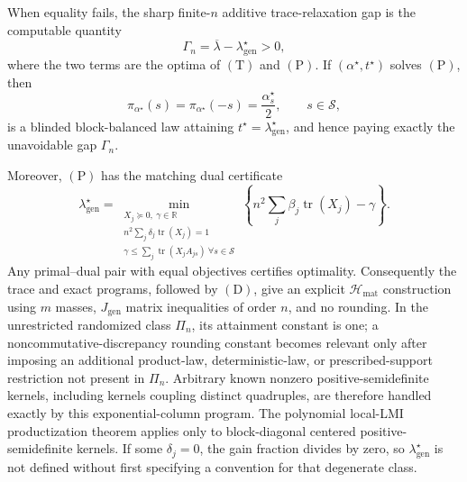When equality fails, the sharp finite-\(n\) additive trace-relaxation gap is the computable quantity
\[
\Gamma_n=\overline\lambda-\lambda_{\mathrm{gen}}^\star>0,
\tag{G}
\]
where the two terms are the optima of \((\mathrm T)\) and \((\mathrm P)\). If \((\alpha^\star,t^\star)\) solves \((\mathrm P)\), then
\[
\pi_{\alpha^\star}(s)=\pi_{\alpha^\star}(-s)=\frac{\alpha_s^\star}{2},
\qquad s\in\mathscr S,
\tag{D}
\]
is a blinded block-balanced law attaining \(t^\star=\lambda_{\mathrm{gen}}^\star\), and hence paying exactly the unavoidable gap \(\Gamma_n\).

Moreover, \((\mathrm P)\) has the matching dual certificate
\[
\lambda_{\mathrm{gen}}^\star
=\min_{\substack{X_j\succeq0,\ \gamma\in\mathbb R\\
n^2\sum_j\delta_j\operatorname{tr}(X_j)=1\\
\gamma\le\sum_j\operatorname{tr}(X_jA_{js})\ \forall s\in\mathscr S}}
\left\{
n^2\sum_j\beta_j\operatorname{tr}(X_j)-\gamma
\right\}.
\tag{C}
\]
Any primal--dual pair with equal objectives certifies optimality. Consequently the trace and exact programs, followed by \((\mathrm D)\), give an explicit \(\mathcal H_{\mathrm{mat}}\) construction using \(m\) masses, \(J_{\mathrm{gen}}\) matrix inequalities of order \(n\), and no rounding. In the unrestricted randomized class \(\Pi_n\), its attainment constant is one; a noncommutative-discrepancy rounding constant becomes relevant only after imposing an additional product-law, deterministic-law, or prescribed-support restriction not present in \(\Pi_n\). Arbitrary known nonzero positive-semidefinite kernels, including kernels coupling distinct quadruples, are therefore handled exactly by this exponential-column program. The polynomial local-LMI productization theorem applies only to block-diagonal centered positive-semidefinite kernels. If some \(\delta_j=0\), the gain fraction divides by zero, so \(\lambda_{\mathrm{gen}}^\star\) is not defined without first specifying a convention for that degenerate class.